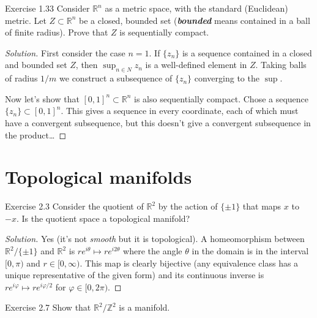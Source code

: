 \begin{thing4}{Exercise 1.33}\label{exer:1.33}\leavevmode
Consider $\mathbb{R}^n$ as a metric space, with the standard (Euclidean) metric. Let $Z \subset \mathbb{R}^n$ be a closed, bounded set (\textit{\textbf{bounded}} means contained in a ball of finite radius). Prove that $Z$ is sequentially compact.
\end{thing4}

\begin{proof}[Solution]\leavevmode
First consider the case $n=1$. If  $\{z_n\}$ is a sequence contained in a closed and bounded set $Z$, then  $\operatorname{sup}_{n \in N}z_n$ is a well-defined element in $Z$. Taking balls of radius $1/m$ we construct a subsequence of  $\{z_n\}$ converging to the $\operatorname{sup}$.

Now let's show that $[0,1]^n \subset\mathbb{R}^n$ is also sequentially compact. Chose a sequence $\{z_n\}\subset [0,1]^n$. This gives a sequence in every coordinate, each of which must have a convergent subsequence, {\color{2}but this doesn't give a convergent subsequence in the product…}
\end{proof}

\section{Topological manifolds}

\begin{thing4}{Exercise 2.3}\label{exer:2.3}\leavevmode
Consider the quotient of  $\mathbb{R}^2$ by the action of $\{\pm  1\}$ that maps $x$ to  $-x$. Is the quotient space a topological manifold?
\end{thing4}

\begin{proof}[Solution]\leavevmode
	Yes (it's not \textit{smooth} but it is topological). A homeomorphism between $\mathbb{R}^2/\{\pm 1\}$ and $\mathbb{R}^2$ is $re^{i\theta}\mapsto re^{i2\theta}$ where the angle $\theta$ in the domain is in the interval  $[0,\pi)$ and  $r\in [0,\infty)$. This map is clearly bijective (any equivalence class has a unique representative of the given form) and its continuous inverse is $re^{i\varphi}\mapsto re^{i\varphi/2}$ for $\varphi \in [0,2\pi)$.
\end{proof}



\begin{thing4}{Exercise 2.7}\label{exer:2.7}\leavevmode
Show that $\mathbb{R}^2/\mathbb{Z}^2$ is a manifold.
\end{thing4}

